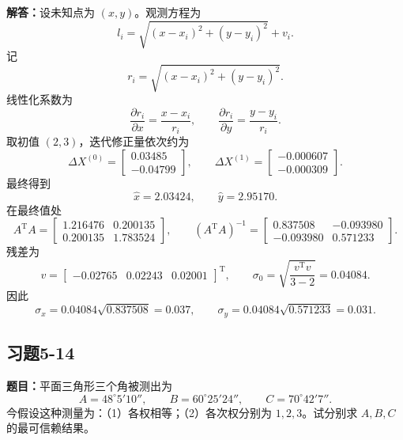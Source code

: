 \documentclass[UTF8,zihao=-4]{ctexart}
\newcommand{\problem}[1]{\subsection*{#1}}
\newcommand{\timu}{\noindent\textbf{题目：}}
\newcommand{\jieda}{\noindent\textbf{解答：}}
\begin{document}
{\jieda 设未知点为 $(x,y)$。观测方程为
\begin{equation*}
    l_i=\sqrt{(x-x_i)^2+(y-y_i)^2}+v_i.
\end{equation*}
记
\begin{equation*}
    r_i=\sqrt{(x-x_i)^2+(y-y_i)^2}.
\end{equation*}
线性化系数为
\begin{equation*}
    \frac{\partial r_i}{\partial x}=\frac{x-x_i}{r_i},
    \qquad
    \frac{\partial r_i}{\partial y}=\frac{y-y_i}{r_i}.
\end{equation*}
取初值 $(2,3)$，迭代修正量依次约为
\begin{equation*}
    \Delta X^{(0)}=\begin{bmatrix}0.03485\\-0.04799\end{bmatrix},
    \qquad
    \Delta X^{(1)}=\begin{bmatrix}-0.000607\\-0.000309\end{bmatrix}.
\end{equation*}
最终得到
\begin{equation*}
    \hat{x}=2.03424,
    \qquad
    \hat{y}=2.95170.
\end{equation*}
在最终值处
\begin{equation*}
    A^{\mathrm T}A=\begin{bmatrix}
        1.216476&0.200135\\
        0.200135&1.783524
    \end{bmatrix},
    \qquad
    (A^{\mathrm T}A)^{-1}=\begin{bmatrix}
        0.837508&-0.093980\\
        -0.093980&0.571233
    \end{bmatrix}.
\end{equation*}
残差为
\begin{equation*}
    v=\begin{bmatrix}-0.02765&0.02243&0.02001\end{bmatrix}^{\mathrm T},
    \qquad
    \sigma_0=\sqrt{\frac{v^{\mathrm T}v}{3-2}}=0.04084.
\end{equation*}
因此
\begin{equation*}
    \sigma_x=0.04084\sqrt{0.837508}=0.037,
    \qquad
    \sigma_y=0.04084\sqrt{0.571233}=0.031.
\end{equation*}

\newpage

\problem{习题5-14}
\timu 平面三角形三个角被测出为
\begin{equation*}
    A=48^\circ5'10'',\qquad B=60^\circ25'24'',\qquad C=70^\circ42'7''.
\end{equation*}
今假设这种测量为：（1）各权相等；（2）各次权分别为 $1,2,3$。试分别求 $A,B,C$ 的最可信赖结果。

}
\end{document}
